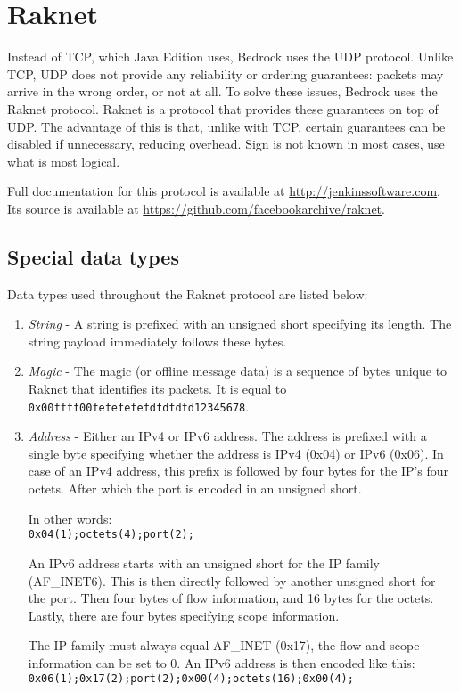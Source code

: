 \chapter{Raknet}\label{chap:raknet}

Instead of TCP, which Java Edition uses, Bedrock uses the UDP protocol.
Unlike TCP, UDP does not provide any reliability or ordering guarantees:
packets may arrive in the wrong order, or not at all. 
To solve these issues, Bedrock uses the Raknet protocol. 
Raknet is a protocol that provides these guarantees on top of UDP.
The advantage of this is that, unlike with TCP, certain guarantees can be disabled if unnecessary,
reducing overhead. Sign is not known in most cases, use what is most logical.

Full documentation for this protocol is available at \url{http://jenkinssoftware.com}.
Its source is available at \url{https://github.com/facebookarchive/raknet}.

\section{Special data types}\label{sec:raknet-types}

Data types used throughout the Raknet protocol are listed below:
\begin{enumerate}
    \item \textit{String} - A string is prefixed with an unsigned short specifying its length.
    The string payload immediately follows these bytes.

    \item \textit{Magic} - The magic (or offline message data) is a sequence of bytes unique to Raknet that identifies its packets.
    It is equal to \\
    \texttt{0x00ffff00fefefefefdfdfdfd12345678}.

    \item \textit{Address} - Either an IPv4 or IPv6 address.
        The address is prefixed with a single byte specifying whether the address is IPv4 (0x04) or IPv6 (0x06).
        In case of an IPv4 address, this prefix is followed by four bytes for the IP's four octets.
        After which the port is encoded in an unsigned short. 

        In other words: \\
        \texttt{0x04(1);octets(4);port(2);}

        An IPv6 address starts with an unsigned short for the IP family (AF\_INET6). 
        This is then directly followed by another unsigned short for the port. 
        Then four bytes of flow information, and 16 bytes for the octets.
        Lastly, there are four bytes specifying scope information.

        The IP family must always equal AF\_INET (0x17), the flow and scope information can be set to 0.
        An IPv6 address is then encoded like this:\\
        \texttt{0x06(1);0x17(2);port(2);0x00(4);octets(16);0x00(4);}
\end{enumerate}

